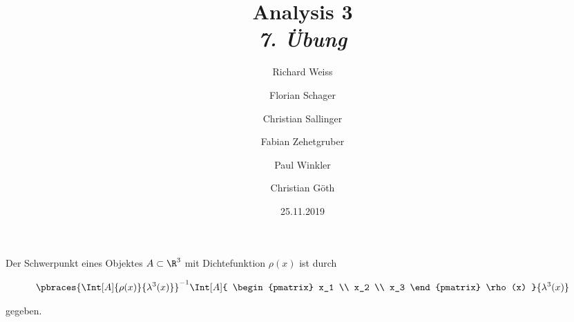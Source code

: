 \documentclass{article}
\title
{
  Analysis 3 \\
  \vspace{4pt}
  \normalsize
  \textit{7. Übung}
}
\author
{
  Richard Weiss
  \and
  Florian Schager
  \and
  Christian Sallinger
  \and
  Fabian Zehetgruber
  \and
  Paul Winkler
  \and
  Christian Göth
}
\date{25.11.2019}
\begin{document}
\maketitle








Der Schwerpunkt eines Objektes $A \subset \R^3$ mit Dichtefunktion $\rho(x)$ ist durch

\begin{align*}
    \pbraces
    {
        \Int[A]{\rho(x)}{\lambda^3(x)}
    }^{-1}
    \Int[A]
    {
        \begin{pmatrix}
            x_1 \\ x_2 \\ x_3
        \end{pmatrix}
        \rho(x)
    }{\lambda^3(x)}
\end{align*}

gegeben.




\printbibliography
\end{document}
